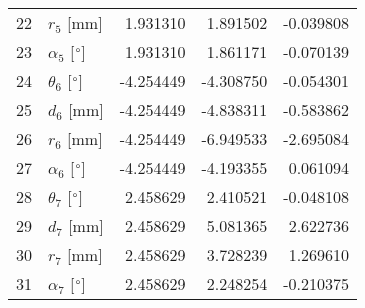 \documentclass{standalone}%
\begin{document}
\begin{tabular}{llrrr}
22 &              $r_{5}$ [mm] &  1.931310 &   1.891502 &  -0.039808 \\
23 &  $\alpha_{5}$ [$\degree$] &  1.931310 &   1.861171 &  -0.070139 \\
24 &  $\theta_{6}$ [$\degree$] & -4.254449 &  -4.308750 &  -0.054301 \\
25 &              $d_{6}$ [mm] & -4.254449 &  -4.838311 &  -0.583862 \\
26 &              $r_{6}$ [mm] & -4.254449 &  -6.949533 &  -2.695084 \\
27 &  $\alpha_{6}$ [$\degree$] & -4.254449 &  -4.193355 &   0.061094 \\
28 &  $\theta_{7}$ [$\degree$] &  2.458629 &   2.410521 &  -0.048108 \\
29 &              $d_{7}$ [mm] &  2.458629 &   5.081365 &   2.622736 \\
30 &              $r_{7}$ [mm] &  2.458629 &   3.728239 &   1.269610 \\
31 &  $\alpha_{7}$ [$\degree$] &  2.458629 &   2.248254 &  -0.210375 \\
\bottomrule
\end{tabular}
%
\end{document}
